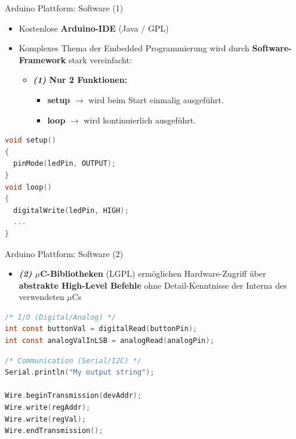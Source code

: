 \documentclass{beamer}
\begin{document}
\begin{frame}[fragile]{Arduino Plattform: Software (1)}
\begin{itemize}
	\item Kostenlose \textbf{Arduino-IDE} (Java / GPL)
\end{itemize}
\begin{itemize}
	\item Komplexes Thema der Embedded Programmierung wird durch \textbf{Software-Framework} stark vereinfacht:
	\begin{itemize}
	 	\item \textbf{\textit{(1)} Nur 2 Funktionen:}
	 	\begin{itemize}
	 		\item \textbf{setup} $\rightarrow$ wird beim Start einmalig ausgef\"uhrt.
	 		\item \textbf{loop} $\rightarrow$ wird kontinuierlich ausgef\"uhrt.
	 	\end{itemize}
	 \end{itemize}
\end{itemize}
\begin{lstlisting}[frame=single, language=C]
void setup()
{
  pinMode(ledPin, OUTPUT);
}
void loop()
{
  digitalWrite(ledPin, HIGH);
  ...
}
\end{lstlisting}
\end{frame}
\begin{frame}[fragile]{Arduino Plattform: Software (2)}
\begin{itemize}
 	\item \textbf{\textit{(2)} $\mu$C-Bibliotheken} (LGPL) erm\"oglichen Hardware-Zugriff \"uber \textbf{abstrakte High-Level Befehle} ohne Detail-Kenntnisse der Interna des verwendeten $\mu$Cs
\end{itemize}
\begin{lstlisting}[frame=single, language=C]
/* I/O (Digital/Analog) */
int const buttonVal = digitalRead(buttonPin);
int const analogValInLSB = analogRead(analogPin); 
\end{lstlisting}
\begin{lstlisting}[frame=single, language=C]
/* Communication (Serial/I2C) */
Serial.println("My output string");

Wire.beginTransmission(devAddr);
Wire.write(regAddr);
Wire.write(regVal);
Wire.endTransmission();
\end{lstlisting}
\end{frame}
\end{document}
